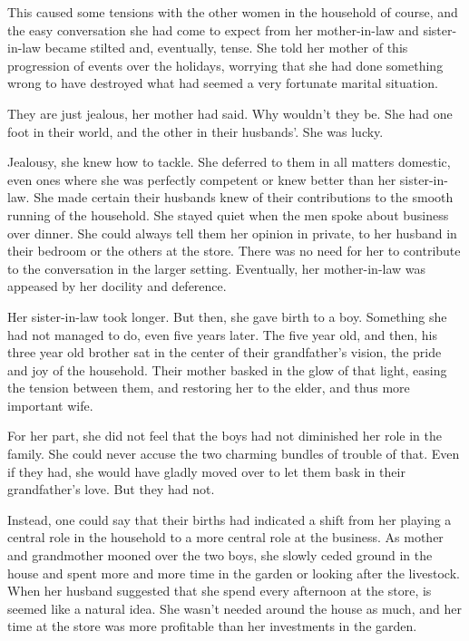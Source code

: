 \documentclass{article}
\begin{document}
This caused some tensions with the other women in the household of course, and the easy conversation she had come to expect from her mother-in-law and sister-in-law became stilted and, eventually, tense. She told her mother of this progression of events over the holidays, worrying that she had done something wrong to have destroyed what had seemed a very fortunate marital situation. 

They are just jealous, her mother had said. Why wouldn't they be. She had one foot in their world, and the other in their husbands'. She was lucky. 

Jealousy, she knew how to tackle. She deferred to them in all matters domestic, even ones where she was perfectly competent or knew better than her sister-in-law. She made certain their husbands knew of their contributions to the smooth running of the household. She stayed quiet when the men spoke about business over dinner. She could always tell them her opinion in private, to her husband in their bedroom or the others at the store. There was no need for her to contribute to the conversation in the larger setting. Eventually, her mother-in-law was appeased by her docility and deference. 

Her sister-in-law took longer. But then, she gave birth to a boy. Something she had not managed to do, even five years later. The five year old, and then, his three year old brother sat in the center of their grandfather's vision, the pride and joy of the household. Their mother basked in the glow of that light, easing the tension between them, and restoring her to the elder, and thus more important wife.

For her part, she did not feel that the boys had not diminished her role in the family. She could never accuse the two charming bundles of trouble of that. Even if they had, she would have  gladly moved over to let them bask in their grandfather's love. But they had not. 

Instead, one could say that their births had indicated a shift from her playing a central role in the household to a more central role at the business. As mother and grandmother mooned over the two boys, she slowly ceded ground in the house and spent more and more time in the garden or looking after the livestock. When her husband suggested that she spend every afternoon at the store, is seemed like a natural idea. She wasn't needed around the house as much, and her time at the store was more profitable than her investments in the garden. 
\end{document}
